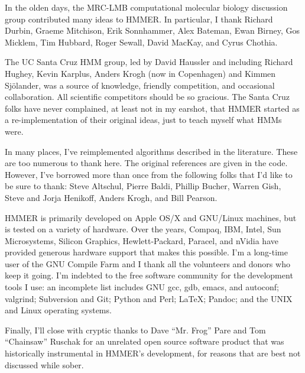 In the olden days, the MRC-LMB computational molecular biology
discussion group contributed many ideas to HMMER. In particular, I
thank Richard Durbin, Graeme Mitchison, Erik Sonnhammer, Alex Bateman,
Ewan Birney, Gos Micklem, Tim Hubbard, Roger Sewall, David MacKay, and
Cyrus Chothia.

The UC Santa Cruz HMM group, led by David Haussler and including
Richard Hughey, Kevin Karplus, Anders Krogh (now in Copenhagen) and
Kimmen Sj\"{o}lander, was a source of knowledge, friendly competition,
and occasional collaboration. All scientific competitors should be so
gracious. The Santa Cruz folks have never complained, at least not in
my earshot, that HMMER started as a re-implementation of their
original ideas, just to teach myself what HMMs were.

In many places, I've reimplemented algorithms described in the
literature. These are too numerous to thank here. The original
references are given in the code. However, I've borrowed more than
once from the following folks that I'd like to be sure to thank: Steve
Altschul, Pierre Baldi, Phillip Bucher, Warren Gish, Steve and Jorja
Henikoff, Anders Krogh, and Bill Pearson.

HMMER is primarily developed on Apple OS/X and GNU/Linux machines, but
is tested on a variety of hardware. Over the years, Compaq, IBM,
Intel, Sun Microsystems, Silicon Graphics, Hewlett-Packard, Paracel,
and nVidia have provided generous hardware support that makes this
possible. I'm a long-time user of the GNU Compile Farm and I thank all
the volunteers and donors who keep it going. I'm indebted to the free
software community for the development tools I use: an incomplete list
includes GNU gcc, gdb, emacs, and autoconf; valgrind; Subversion and
Git; Python and Perl; \LaTeX; Pandoc; and the UNIX and Linux operating
systems.

Finally, I'll close with cryptic thanks to Dave ``Mr. Frog'' Pare and
Tom ``Chainsaw'' Ruschak for an unrelated open source software product
that was historically instrumental in HMMER's development, for reasons
that are best not discussed while sober.



